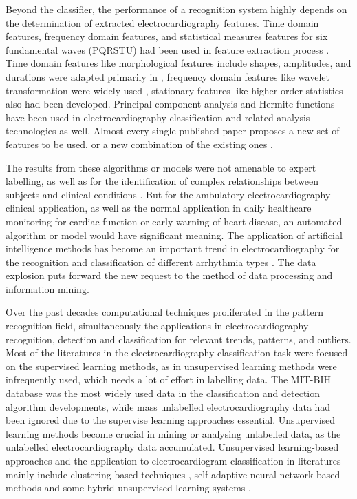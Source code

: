 \documentclass[journal]{IEEEtran}
\begin{document}
Beyond the classifier, the performance of a recognition system highly depends on the determination of extracted electrocardiography features. Time domain features, frequency domain features, and statistical measures features for six fundamental waves (PQRSTU) had been used in feature extraction process \cite{chia}. 
Time domain features like morphological features include shapes, amplitudes, and durations were adapted primarily in \cite{jekova, christove, can}, frequency domain features like wavelet transformation were widely used \cite{inan}, \cite{banerjee} stationary features like higher-order statistics also had been developed. 
Principal component analysis \cite{stam} and Hermite functions \cite{lager} have been used in electrocardiography classification and related analysis technologies as well.
Almost every single published paper proposes a new set of features to be used, or a new combination of the existing ones \cite{mar}.


The results from these algorithms or models were not amenable to expert labelling, as well as for the identification of complex relationships between subjects and clinical conditions \cite{clifford}.
But for the ambulatory electrocardiography clinical application, as well as the normal application in daily healthcare monitoring for cardiac function or early warning of heart disease, an automated algorithm or model would have significant meaning.
The application of artificial intelligence methods has become an important trend in electrocardiography for the recognition and classification of different arrhythmia types \cite{clifford}. 
The data explosion puts forward the new request to the method of data processing and information mining.



Over the past decades computational techniques proliferated in the pattern recognition field, simultaneously the applications in electrocardiography recognition, detection and classification for relevant trends, patterns, and outliers. 
Most of the literatures in the electrocardiography classification task were focused on the supervised learning methods, as in unsupervised learning methods were infrequently used, which needs a lot of effort in labelling data. The MIT-BIH database \cite{physionet} was the most widely used data in the classification and detection algorithm developments, while mass unlabelled electrocardiography data had been ignored due to the supervise learning approaches essential. 
Unsupervised learning methods become crucial in mining or analysing unlabelled data, as the unlabelled electrocardiography data accumulated. Unsupervised learning-based approaches and the application to electrocardiogram classification in literatures mainly include clustering-based techniques \cite{lager, nishizawa, maier}, self-adaptive neural network-based methods \cite{palreddy, risk} and some hybrid unsupervised learning systems \cite{tadejko}. 
\end{document}
